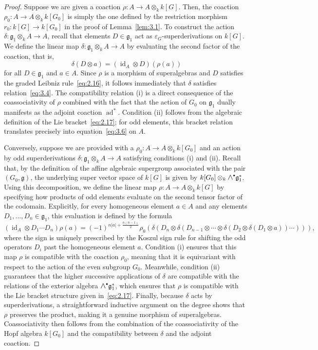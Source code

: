 \documentclass[11pt,a4paper,reqno,noamsfonts]{amsart}
\numberwithin{equation}{section}
\theoremstyle{definition}
\theoremstyle{remark}
\newcommand{\gfrak}{\ensuremath{\mathfrak{g}}}
\DeclareMathOperator{\id}{id}
\DeclareMathOperator{\ad}{ad}
\newcommand{\medwedge}{\mathbin{\scalebox{1.2}{$\wedge$}}}
\newcommand*{\sbullet}{\raisebox{0.1ex}{\scalebox{0.6}{$\bullet$}}}
\begin{document}
\begin{proof}
Suppose we are given a coaction $\rho \colon A \to A \otimes_k k[G]$. Then, the coaction $\rho_0 \colon A \to A \otimes_k k[G_0]$ is simply the one defined by the restriction morphism $r_0 \colon k[G] \to k[G_0]$ in the proof of Lemma~\ref{lem:3.1}. To construct the action $\delta \colon \gfrak_1 \otimes_k A \to A$, recall that elements $D \in \gfrak_1$ act as $\varepsilon _{G}$-superderivations on $k[G]$. We define the linear map $\delta \colon \gfrak_1 \otimes_k A \to A$ by evaluating the second factor of the coaction, that is,
$$
\delta (D\otimes a)=(\id_{A}\otimes D)(\rho (a))
$$
for all $D \in \gfrak_1$ and $a \in A$. Since $\rho$ is a morphism of superalgebras and $D$ satisfies the graded Leibniz rule~\eqref{eq:2.16}, it follows immediately that $\delta$ satisfies relation~\eqref{eq:3.4}. The compatibility relation (i) is a direct consequence of the coassociativity of $\rho$ combined with the fact that the action of $G_{0}$ on $\gfrak_{1}$ dually manifests as the adjoint coaction $\ad^*$. Condition (ii) follows from the algebraic definition of the Lie bracket~\eqref{eq:2.17}; for odd elements, this bracket relation translates precisely into equation~\eqref{eq:3.6} on $A$.

Conversely, suppose we are provided with a $\rho_0 \colon A \to A \otimes_k k[G_0]$ and an action by odd superderivations $\delta \colon \gfrak_1 \otimes_k A \to A$ satisfying conditions (i) and (ii). Recall that, by the definition of the affine algebraic supergroup associated with the pair $(G_0, \gfrak)$, the underlying super vector space of $k[G]$ is given by $k[G_0] \otimes_k \medwedge^{\sbullet} \gfrak_1^*$. Using this decomposition, we define the linear map $\rho \colon A \to A \otimes_k k[G]$ by specifying how products of odd elements evaluate on the second tensor factor of the codomain. Explicitly, for every homogeneous element $a \in A$ and any elements $D_1, \dots, D_n \in \mathfrak{g}_1$, this evaluation is defined by the formula
$$
(\id_A \otimes D_1 \cdots D_n)\rho(a) = (-1)^{n\lvert a \rvert + \frac{n(n-1)}{2}} \rho_0 ( \delta(D_n \otimes \delta(D_{n-1} \otimes \cdots \otimes \delta(D_2 \otimes \delta(D_1 \otimes a)) \cdots )) ),
$$
where the sign is uniquely prescribed by the Koszul sign rule for shifting the odd operators $D_{i}$ past the homogeneous element $a$. Condition (i) ensures that this map $\rho$ is compatible with the coaction $\rho _{0}$, meaning that it is equivariant with respect to the action of the even subgroup $G_{0}$. Meanwhile, condition (ii) guarantees that the higher successive applications of $\delta$ are compatible with the relations of the exterior algebra $\medwedge^{\sbullet} \gfrak_1^*$, which ensures that $\rho$ is compatible with the Lie bracket structure given in~\eqref{eq:2.17}. Finally, because $\delta$ acts by superderivations, a straightforward inductive argument on the degree shows that $\rho$ preserves the product, making it a genuine morphism of superalgebras.  Coassociativity then follows from the combination of the coassociativity of the Hopf algebra $k[G_0]$ and the compatibility between $\delta$ and the adjoint coaction.
\end{proof}
\end{document}
